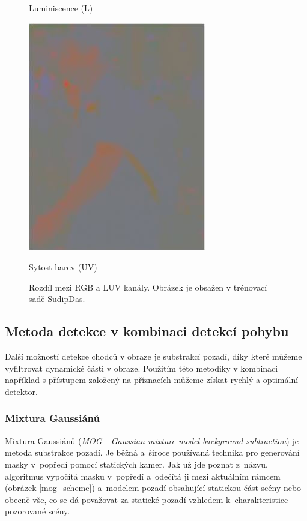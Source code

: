 \begin{figure}[H]
\begin{minipage}[b]{.3\textwidth}
  \caption*{Luminiscence  (L)}
\end{minipage}
\begin{minipage}[b]{.3\textwidth}
  \centering
  \includegraphics[width=.7\linewidth]{figures/uv_chroma}
  \caption*{Sytost barev (UV)}
\end{minipage}
\caption{Rozdíl mezi RGB a LUV kanály. Obrázek je obsažen v trénovací sadě SudipDas. \cite{sudipDas}}
\label{fig:luv}
\end{figure}

\subsection{Metoda detekce v kombinaci detekcí pohybu} %
Další možností detekce chodců v obraze je substrakcí pozadí, díky které můžeme vyfiltrovat dynamické části v obraze. Použitím této metodiky v kombinaci například s přístupem založený na příznacích můžeme získat rychlý a optimální detektor.

\subsubsection*{Mixtura Gaussiánů}
Mixtura Gaussiánů (\textit{MOG - Gaussian mixture model background subtraction}) \cite{mog:zivkovic} je metoda substrakce pozadí.  Je běžná a~široce používaná technika pro generování masky v~popředí pomocí statických kamer. Jak už jde poznat z~názvu, algoritmus vypočítá masku v~popředí a~odečítá ji mezi aktuálním rámcem (obrázek \ref{mog_scheme}) a~modelem pozadí obsahující statickou část scény nebo obecně vše, co se dá považovat za statické pozadí vzhledem k~charakteristice pozorované scény. 

